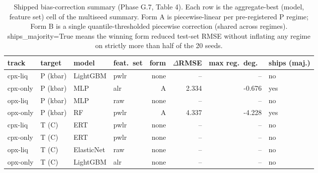 \begin{table}[tbp]
\centering
\caption{Shipped bias-correction summary (Phase G.7, Table 4). Each row is the aggregate-best (model, feature set) cell of the multiseed summary. Form A is piecewise-linear per pre-registered P regime; Form B is a single quantile-thresholded piecewise correction (shared across regimes). ships\_majority=True means the winning form reduced test-set RMSE without inflating any regime on strictly more than half of the 20 seeds.}
\label{tab:bc_shipped}
\begin{tabular}{llllr r r l}
\toprule
track & target & model & feat.\ set & form & $\Delta$RMSE & max reg.\ deg.\ & ships (maj.) \\
\midrule
cpx-liq & P (kbar) & LightGBM & pwlr & none & -- & -- & no \\
cpx-only & P (kbar) & MLP & alr & A & 2.334 & -0.676 & yes \\
opx-liq & P (kbar) & MLP & raw & none & -- & -- & no \\
opx-only & P (kbar) & RF & pwlr & A & 4.337 & -4.228 & yes \\
cpx-liq & T (C) & ERT & pwlr & none & -- & -- & no \\
cpx-only & T (C) & ERT & pwlr & none & -- & -- & no \\
opx-liq & T (C) & ElasticNet & raw & none & -- & -- & no \\
opx-only & T (C) & LightGBM & alr & none & -- & -- & no \\
\bottomrule
\end{tabular}
\end{table}
